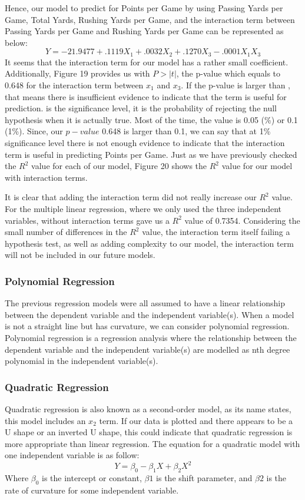 \documentclass[a4paper,12pt]{report}
\begin{document}
Hence, our model to predict for Points per Game by using Passing Yards per Game, Total Yards, Rushing Yards per Game, and the interaction term between Passing Yards per Game and Rushing Yards per Game can be represented as below:
$$Y=-21.9477+.1119X_1+.0032X_2+.1270X_3-.0001X_1X_3$$
It seems that the interaction term for our model has a rather small coefficient. Additionally, Figure 19 provides us with $P>|t|$, the p-value which equals to 0.648 for the interaction term between $x_1$ and $x_3$. If the p-value is larger than , that means there is insufficient evidence to indicate that the term is useful for prediction.  is the significance level, it is the probability of rejecting the null hypothesis when it is actually true. Most of the time, the  value is 0.05 (\%) or 0.1 (1\%). Since, our $p-value$ 0.648 is larger than 0.1, we can say that at 1\% significance level there is not enough evidence to indicate that the interaction term is useful in predicting Points per Game. Just as we have previously checked the $R^2$  value for each of our model, Figure 20 shows the $R^2$ value for our model with interaction terms.

It is clear that adding the interaction term did not really increase our $R^2$ value. For the multiple linear regression, where we only used the three independent variables, without interaction terms gave us a $R^2$ value of 0.7354. Considering the small number of differences in the $R^2$ value, the interaction term itself failing a hypothesis test, as well as adding complexity to our model, the interaction term will not be included in our future models.

\subsubsection{Polynomial Regression}
The previous regression models were all assumed to have a linear relationship between the dependent variable and the independent variable(s). When a model is not a straight line but has curvature, we can consider polynomial regression. Polynomial regression is a regression analysis where the relationship between the dependent variable and the independent variable(s) are modelled as nth degree polynomial in the independent variable(s).
 
\subsubsection{Quadratic Regression}
Quadratic regression is also known as a second-order model, as its name states, this model includes an $x_2$ term. If our data is plotted and there appears to be a U shape or an inverted U shape, this could indicate that quadratic regression is more appropriate than linear regression. The equation for a quadratic model with one independent variable is as follow:
$$Y=\beta_0-\beta_1X+\beta_2X^2$$
Where $\beta_0$ is the intercept or constant, $\beta1$ is the shift parameter, and $\beta2$ is the rate of curvature for some independent variable.
\end{document}
